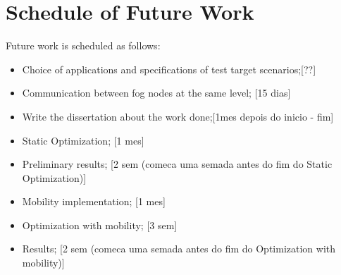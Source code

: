 \section{Schedule of Future Work}
\label{sec:Schedule}

Future work is scheduled as follows:
\begin{itemize}
  \item Choice of applications and specifications of test target scenarios;[??]
  \item Communication between fog nodes at the same level; [15 dias]
  \item Write the dissertation about the work done;[1mes depois do inicio - fim]
  \item Static Optimization; [1 mes]
  \item Preliminary results; [2 sem (comeca uma semada antes do fim do Static Optimization)]
  \item Mobility implementation; [1 mes]
  \item Optimization with mobility; [3 sem]
  \item Results; [2 sem (comeca uma semada antes do fim do Optimization with mobility)]
\end{itemize}
